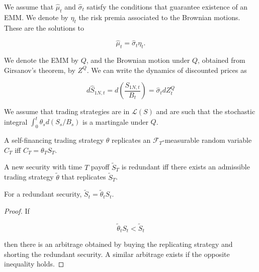 \documentclass[\topdir/lecture\_notes.tex]{subfiles}
\begin{document}
We assume that \(\hat{\mu}_{t}\) and \(\hat{\sigma}_{t}\) satisfy the conditions that guarantee existence of an EMM. We denote by \(\eta_{t}\) the risk premia associated to the Brownian motions. These are the solutions to

\begin{equation*}
\hat{\mu}_{t}=\hat{\sigma}_{t} \eta_{t} .
\end{equation*}

We denote the EMM by \(Q\), and the Brownian motion under \(Q\), obtained from Girsanov's theorem, by \(Z^{Q}\). We can write the dynamics of discounted prices as

\begin{equation*}
d \hat{S}_{1 N, t}=d\left(\frac{S_{1 N, t}}{B_{t}}\right)=\hat{\sigma}_{t} d Z_{t}^{Q}
\end{equation*}

We assume that trading strategies are in \(\mathcal{L}(S)\) and are such that the stochastic integral \(\int_{0}^{t} \theta_{s} d\left(S_{s} / B_{s}\right)\) is a martingale under \(Q\).

\begin{defn}\label{def:replicates}
A self-financing trading strategy \(\theta\) replicates an \(\mathcal{F}_{T}\)-measurable random variable \(C_{T}\) iff \(C_{T}=\theta_{T} S_{T}\).
\end{defn}

\begin{defn}\label{def:redundant_security}
A new security with time \(T\) payoff \(\tilde{S}_{T}\) is redundant iff there exists an admissible trading strategy \(\tilde{\theta}\) that replicates \(\tilde{S}_{T}\).
\end{defn}

\begin{proposition}\label{prop:redundant_security_pricing}
For a redundant security, \(\tilde{S}_{t}=\tilde{\theta}_{t} S_{t}\).
\end{proposition}

\begin{proof}
If

\begin{equation*}
\tilde{\theta}_{t} S_{t}<\tilde{S}_{t}
\end{equation*}

then there is an arbitrage obtained by buying the replicating strategy and shorting the redundant security. A similar arbitrage exists if the opposite inequality holds.
\end{proof}
\end{document}
